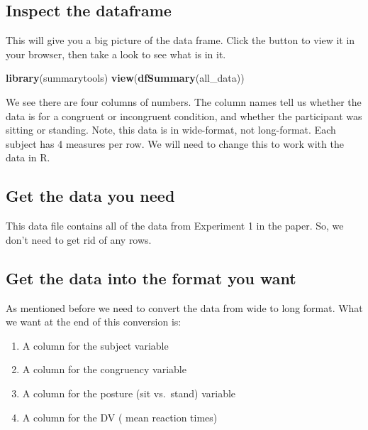 \documentclass[]{book}
\newenvironment{Shaded}{\begin{snugshade}}{\end{snugshade}}
\newcommand{\KeywordTok}[1]{\textcolor[rgb]{0.13,0.29,0.53}{\textbf{#1}}}
\newcommand{\NormalTok}[1]{#1}
\providecommand{\tightlist}{%
  \setlength{\itemsep}{0pt}\setlength{\parskip}{0pt}}
\begin{document}
\subsection{Inspect the dataframe}\label{inspect-the-dataframe-2}

This will give you a big picture of the data frame. Click the button to
view it in your browser, then take a look to see what is in it.

\begin{Shaded}
\begin{Highlighting}[]
\KeywordTok{library}\NormalTok{(summarytools)}
\KeywordTok{view}\NormalTok{(}\KeywordTok{dfSummary}\NormalTok{(all_data))}
\end{Highlighting}
\end{Shaded}

We see there are four columns of numbers. The column names tell us
whether the data is for a congruent or incongruent condition, and
whether the participant was sitting or standing. Note, this data is in
wide-format, not long-format. Each subject has 4 measures per row. We
will need to change this to work with the data in R.

\subsection{Get the data you need}\label{get-the-data-you-need-2}

This data file contains all of the data from Experiment 1 in the paper.
So, we don't need to get rid of any rows.

\subsection{Get the data into the format you
want}\label{get-the-data-into-the-format-you-want}

As mentioned before we need to convert the data from wide to long
format. What we want at the end of this conversion is:

\begin{enumerate}
\def\labelenumi{\arabic{enumi}.}
\tightlist
\item
  A column for the subject variable
\item
  A column for the congruency variable
\item
  A column for the posture (sit vs.~stand) variable
\item
  A column for the DV ( mean reaction times)
\end{enumerate}
\end{document}
